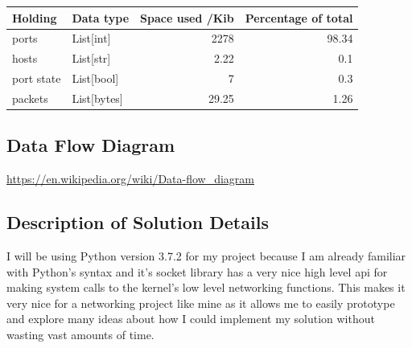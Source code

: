 \documentclass[titlepage]{article}
\let\Oldsubsection\subsection{}
\renewcommand{\subsection}{\FloatBarrier\Oldsubsection}
\begin{document}
\begin{center}
  \begin{tabular}{p{3cm} l r r}
    \toprule
    Holding    & Data type   & Space used /Kib & Percentage of total \\
    \midrule
    ports      & List[int]   & 2278            & 98.34 \\
    hosts      & List[str]   & 2.22            & 0.1   \\
    port state & List[bool]  & 7               & 0.3   \\
    packets    & List[bytes] & 29.25           & 1.26  \\
    \bottomrule
  \end{tabular}
\end{center}

\subsection{Data Flow Diagram}

\textbf{\color{red}{This seems to be fairly relevant and to do with how data goes through my program
    i.e.\ going from the network to my port scanner into a target object and other scanners
before version detection and finally displaying to the user. Make a flowchart for this.}}

\href{https://en.wikipedia.org/wiki/Data-flow_diagram<Paste>}{https://en.wikipedia.org/wiki/Data-flow\_diagram}

\subsection{Description of Solution Details}

I will be using Python version 3.7.2 for my project because I am already familiar with Python's
syntax and it's socket library has a very nice high level \gls{api} for making system calls to
the kernel's low level networking functions. This makes it very nice for a networking project
like mine as it allows me to easily prototype and explore many ideas about how I could implement
my solution without wasting vast amounts of time.
\end{document}
